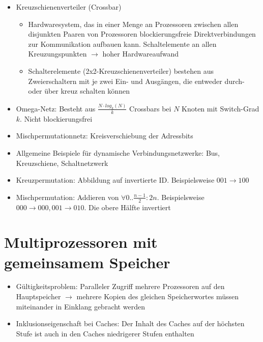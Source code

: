 \begin{itemize}
\begin{itemize}
\begin{itemize}
				\item Kreuzschienenverteiler (Crossbar)
				\begin{itemize}
					\item Hardwaresystem, das in einer Menge an Prozessoren zwischen allen disjunkten Paaren von Prozessoren blockierungsfreie Direktverbindungen zur Kommunikation aufbauen kann. Schaltelemente an allen Kreuzungspunkten \(\rightarrow\) hoher Hardwareaufwand
					\item Schalterelemente (2x2-Kreuzschienenverteiler) bestehen aus Zweierschaltern mit je zwei Ein- und Ausgängen, die entweder durch- oder über kreuz schalten können
				\end{itemize}
				\item Omega-Netz: Besteht aus \(\frac{N\cdot log_k(N)}{k}\) Crossbars bei \(N\) Knoten mit Switch-Grad \(k\). Nicht blockierungsfrei
				\item Mischpermutationnetz: Kreisverschiebung der Adressbits
				\item Allgemeine Beispiele für dynamische Verbindungsnetzwerke: Bus, Kreuzschiene, Schaltnetzwerk
				\item Kreuzpermutation: Abbildung auf invertierte ID. Beispielsweise \(001 \longrightarrow 100\)
				\item Mischpermutation: Addieren von \(\forall 0..\frac{n-1}{2}:2n\). Beispielsweise \(000 \longrightarrow 000, 001 \longrightarrow 010\). Die obere Hälfte invertiert
			\end{itemize}
		\end{itemize}
	\end{itemize}


\section{Multiprozessoren mit gemeinsamem Speicher}
	\begin{itemize}
		\item Gültigkeitsproblem: Paralleler Zugriff mehrere Prozessoren auf den Hauptspeicher \(\rightarrow\) mehrere Kopien des gleichen Speicherwortes müssen miteinander in Einklang gebracht werden
		\item Inklusionseigenschaft bei Caches: Der Inhalt des Caches auf der höchsten Stufe ist auch in den Caches niedrigerer Stufen enthalten
	\end{itemize}	
